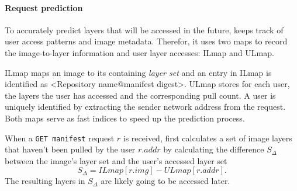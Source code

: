 \paragraph{Request prediction} %
%
To accurately predict layers that will be accessed in the future, \sysname keeps
track of user access patterns and image metadata.
Therefor, it uses two maps to record the image-to-layer information
and user layer accesses: ILmap and ULmap.
%
%

ILmap maps an image to its containing \emph{layer set} and an entry in ILmap
is identified as \textless{}Repository name@manifest digest\textgreater.
%
%
ULmap stores for each user, the layers the user has accessed and the corresponding pull count.
A user is uniquely identified by extracting the sender network address from the request.
%
Both maps serve as fast indices to speed up the prediction process.

When a \texttt{GET manifest} request $r$ is received,
\sysname first calculates a set of image layers that haven't been pulled by the user $r.addr$ 
by calculating the difference $S_{\Delta}$ between the image's layer set and the user's accessed layer set
%
\begin{equation*}
S_{\Delta} = ILmap[r.img] - ULmap[r.addr].
\end{equation*}
%
The resulting layers in $S_{\Delta}$ are likely going to be accessed later.

